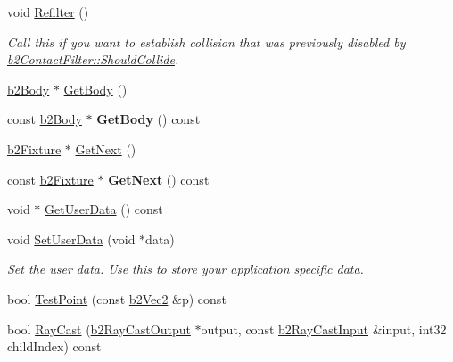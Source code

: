 \begin{DoxyCompactItemize}
\mbox{\label{classb2_fixture_a45d3320f94811d67383c48466165fa26}} 
void \hyperlink{classb2_fixture_a45d3320f94811d67383c48466165fa26}{Refilter} ()
\begin{DoxyCompactList}\small\item\em Call this if you want to establish collision that was previously disabled by \hyperlink{classb2_contact_filter_aac8f6155d1f577d125db587f5269289b}{b2\+Contact\+Filter\+::\+Should\+Collide}. \end{DoxyCompactList}\item 
\hyperlink{classb2_body}{b2\+Body} $\ast$ \hyperlink{classb2_fixture_a9d6536ef274d768e86ab0a8330921535}{Get\+Body} ()
\item 
\mbox{\label{classb2_fixture_ae9cabf82e360f92e8fcb36b1923ab991}} 
const \hyperlink{classb2_body}{b2\+Body} $\ast$ {\bfseries Get\+Body} () const
\item 
\hyperlink{classb2_fixture}{b2\+Fixture} $\ast$ \hyperlink{classb2_fixture_a0241952461f6f1a04a3c850306390fd2}{Get\+Next} ()
\item 
\mbox{\label{classb2_fixture_a6b474fa22b49de3dbe446a67f021beb2}} 
const \hyperlink{classb2_fixture}{b2\+Fixture} $\ast$ {\bfseries Get\+Next} () const
\item 
void $\ast$ \hyperlink{classb2_fixture_ae2a865ed59ffe9b1cb89f577052f4d50}{Get\+User\+Data} () const
\item 
\mbox{\label{classb2_fixture_a3db7f89ef4493247d922fe3d96351ad9}} 
void \hyperlink{classb2_fixture_a3db7f89ef4493247d922fe3d96351ad9}{Set\+User\+Data} (void $\ast$data)
\begin{DoxyCompactList}\small\item\em Set the user data. Use this to store your application specific data. \end{DoxyCompactList}\item 
bool \hyperlink{classb2_fixture_aa56d3ca04a5d0478c6477876cd480cc6}{Test\+Point} (const \hyperlink{structb2_vec2}{b2\+Vec2} \&p) const
\item 
bool \hyperlink{classb2_fixture_aaaafd69aa3e1a922acc4b9d7fb49170a}{Ray\+Cast} (\hyperlink{structb2_ray_cast_output}{b2\+Ray\+Cast\+Output} $\ast$output, const \hyperlink{structb2_ray_cast_input}{b2\+Ray\+Cast\+Input} \&input, int32 child\+Index) const
\item 

\end{DoxyCompactItemize}
